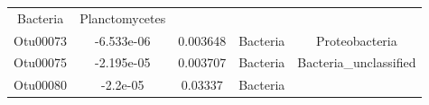 \documentclass[]{article}
\begin{document}
\begin{longtable}[]{@{}ccccc@{}}
\begin{minipage}[t]{0.13\columnwidth}
Bacteria\strut
\end{minipage} & \begin{minipage}[t]{0.27\columnwidth}\centering\strut
Planctomycetes\strut
\end{minipage}\tabularnewline
\begin{minipage}[t]{0.13\columnwidth}\centering\strut
Otu00073\strut
\end{minipage} & \begin{minipage}[t]{0.16\columnwidth}\centering\strut
-6.533e-06\strut
\end{minipage} & \begin{minipage}[t]{0.14\columnwidth}\centering\strut
0.003648\strut
\end{minipage} & \begin{minipage}[t]{0.13\columnwidth}\centering\strut
Bacteria\strut
\end{minipage} & \begin{minipage}[t]{0.27\columnwidth}\centering\strut
Proteobacteria\strut
\end{minipage}\tabularnewline
\begin{minipage}[t]{0.13\columnwidth}\centering\strut
Otu00075\strut
\end{minipage} & \begin{minipage}[t]{0.16\columnwidth}\centering\strut
-2.195e-05\strut
\end{minipage} & \begin{minipage}[t]{0.14\columnwidth}\centering\strut
0.003707\strut
\end{minipage} & \begin{minipage}[t]{0.13\columnwidth}\centering\strut
Bacteria\strut
\end{minipage} & \begin{minipage}[t]{0.27\columnwidth}\centering\strut
Bacteria\_unclassified\strut
\end{minipage}\tabularnewline
\begin{minipage}[t]{0.13\columnwidth}\centering\strut
Otu00080\strut
\end{minipage} & \begin{minipage}[t]{0.16\columnwidth}\centering\strut
-2.2e-05\strut
\end{minipage} & \begin{minipage}[t]{0.14\columnwidth}\centering\strut
0.03337\strut
\end{minipage} & \begin{minipage}[t]{0.13\columnwidth}\centering\strut
Bacteria\strut
\end{minipage} & \begin{minipage}[t]{0.27\columnwidth}\centering\strut

\end{minipage}
\end{longtable}
\end{document}
